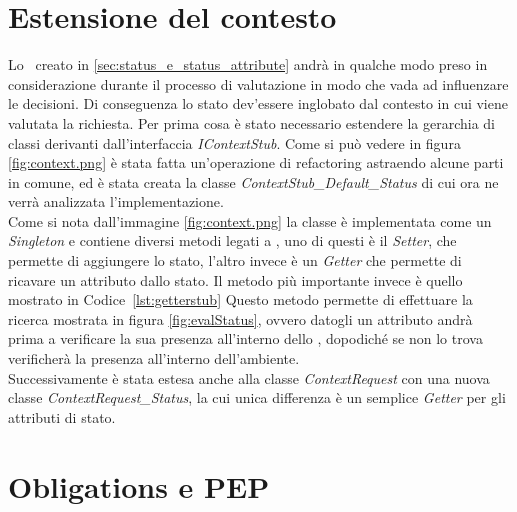 \section{Estensione del contesto} %
\label{sec:estensione_del_contesto}

Lo \status \ creato in \ref{sec:status_e_status_attribute} andrà in qualche modo preso in considerazione durante il processo di valutazione in modo che vada ad influenzare le decisioni.
Di conseguenza lo stato dev'essere inglobato dal contesto in cui viene valutata la richiesta.
Per prima cosa è stato necessario estendere la gerarchia di classi derivanti dall'interfaccia \textit{IContextStub}. Come si può vedere in figura \ref{fig:context.png} è stata fatta un'operazione di refactoring astraendo alcune parti in comune, ed è stata creata la classe \textit{ContextStub\_Default\_Status} di cui ora ne verrà analizzata l'implementazione.\\
Come si nota dall'immagine \ref{fig:context.png} la classe è implementata come un \textit{Singleton} e contiene diversi metodi legati a \status, uno di questi è il \textit{Setter}, che permette di aggiungere lo stato, l'altro invece è un \textit{Getter} che permette di ricavare un attributo dallo stato.
Il metodo più importante invece è quello mostrato in Codice~\ref{lst:getterstub}
Questo metodo permette di effettuare la ricerca mostrata in figura \ref{fig:evalStatus}, ovvero datogli un attributo andrà prima a verificare la sua presenza all'interno dello \status, dopodiché se non lo trova verificherà la presenza all'interno dell'ambiente.\\
Successivamente è stata estesa anche alla classe \textit{ContextRequest} con una nuova classe \textit{ContextRequest\_Status}, la cui unica differenza è un semplice \textit{Getter} per gli attributi di stato.

\section{Obligations e PEP} %
\label{sec:obligations_e_pep}

